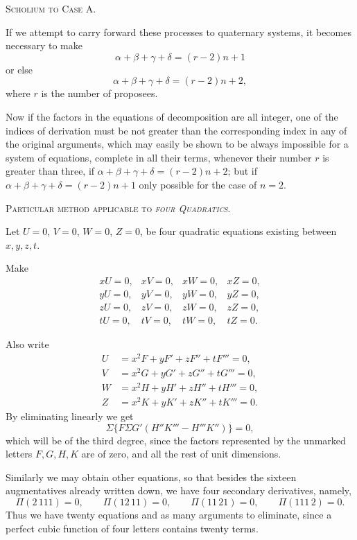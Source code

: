 \documentclass[11pt]{article}
\newcommand{\sourcepage}[1]{\marginpar{\scriptsize p.~#1}}
\begin{document}
\begin{center}\scshape Scholium to Case A.\end{center}

If we attempt to carry forward these processes to quaternary systems, it becomes necessary to make
\[
 \alpha+\beta+\gamma+\delta=(r-2)n+1
\]
or else
\[
 \alpha+\beta+\gamma+\delta=(r-2)n+2,
\]
where $r$ is the number of proposees.

Now if the factors in the equations of decomposition are all integer, one of the indices of derivation must be not greater than the corresponding index in any of the original arguments, which may easily be shown to be always impossible for a system of equations, complete in all their terms, whenever their number $r$ is greater than three, if $\alpha+\beta+\gamma+\delta=(r-2)n+2$; but if $\alpha+\beta+\gamma+\delta=(r-2)n+1$ only possible for the case of $n=2$.

\begin{center}\scshape Particular method applicable to \emph{four Quadratics}.\end{center}

Let $U=0$, $V=0$, $W=0$, $Z=0$, be four quadratic equations existing between $x,y,z,t$.

Make
\[
\begin{array}{llll}
 xU=0,& xV=0,& xW=0,& xZ=0,\\
 yU=0,& yV=0,& yW=0,& yZ=0,\\
 zU=0,& zV=0,& zW=0,& zZ=0,\\
 tU=0,& tV=0,& tW=0,& tZ=0.
\end{array}
\]

\sourcepage{81}
Also write
\[
\begin{aligned}
 U&=x^2F+yF'+zF''+tF'''=0,\\
 V&=x^2G+yG'+zG''+tG'''=0,\\
 W&=x^2H+yH'+zH''+tH'''=0,\\
 Z&=x^2K+yK'+zK''+tK'''=0.
\end{aligned}
\]
By eliminating linearly we get
\[
 \Sigma\{F\Sigma G'(H''K'''-H'''K'')\}=0,
\]
which will be of the third degree, since the factors represented by the unmarked letters $F,G,H,K$ are of zero, and all the rest of unit dimensions.

Similarly we may obtain other equations, so that besides the sixteen augmentatives already written down, we have four secondary derivatives, namely,
\[
 \Pi(2\,111)=0,
 \qquad \Pi(12\,11)=0,
 \qquad \Pi(11\,21)=0,
 \qquad \Pi(111\,2)=0.
\]
Thus we have twenty equations and as many arguments to eliminate, since a perfect cubic function of four letters contains twenty terms.
\end{document}
